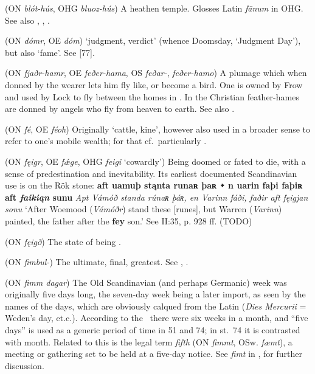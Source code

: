 \begin{itemize}
 (ON \emph{blót-hús}, OHG \emph{bluoz-hús})
  A heathen temple. Glosses Latin \emph{fānum} in OHG. See also , , .

 (ON \emph{dómr}, OE \emph{dóm})
  ‘judgment, verdict’ (whence Doomsday, ‘Judgment Day’), but also ‘fame’.  See [77].

 (ON \emph{fjaðr-hamr}, OE \emph{feðer-hama}, OS \emph{feðar-}, \emph{feðer-hamo})
  A plumage which when donned by the wearer lets him fly like, or become a bird.  One is owned by Frow and used by Lock to fly between the homes in .  In the Christian  feather-hames are donned by angels who fly from heaven to earth.  See also .

 (ON \emph{fé}, OE \emph{féoh})
  Originally ‘cattle, kine’, however also used in a broader sense to refer to one’s mobile wealth; for that cf.~particularly .

 (ON \emph{fęigr}, OE \emph{fǽge}, OHG \emph{feigi} ‘cowardly’)
  Being doomed or fated to die, with a sense of predestination and inevitability.  Its earliest documented Scandinavian use is on the Rök stone: \textbf{aft uamuþ stąnta runaʀ þaʀ ᛭ n uarin faþi faþiʀ aft \emph{faikiąn} sunu} \emph{Apt Vámóð standa rúnaʀ þáʀ, en Varinn fáði, faðir aft \emph{fęigjan} sonu} ‘After Woemood (\emph{Vámóðr}) stand these [runes], but Warren (\emph{Varinn}) painted, the father after the \textbf{fey} son.’  See  II:35, p. 928 ff. (TODO)

 (ON \emph{fęigð})
  The state of being .

 (ON \emph{fimbul-})
  The ultimate, final, greatest.  See , .

 (ON \emph{fimm dagar})
  The Old Scandinavian (and perhaps Germanic) week was originally five days long, the seven-day week being a later import, as seen by the names of the days, which are obviously calqued from the Latin (\emph{Dies Mercurii} = Weden’s day, et.c.).  According to the \Gulatingslog\ there were six weeks in a month, and “five days” is used as a generic period of time in  51 and 74; in st.~74 it is contrasted with month.  Related to this is the legal term \emph{fifth} (ON \emph{fimmt}, OSw. \emph{fæmt}), a meeting or gathering set to be held at a five-day notice.  See \emph{fimt} in \CV,  for further discussion.


\end{itemize}
